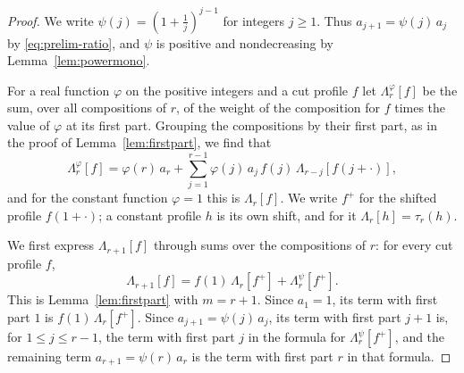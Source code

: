 \documentclass{amsart}
\theoremstyle{definition}
\theoremstyle{remark}
\numberwithin{equation}{section}
\begin{document}
\begin{proof}
We write $\psi(j)=(1+\frac1j)^{j-1}$ for integers $j\ge 1$. Thus $a_{j+1}=\psi(j)\,a_j$ by \eqref{eq:prelim-ratio}, and $\psi$ is positive and nondecreasing by Lemma~\ref{lem:powermono}.

For a real function $\varphi$ on the positive integers and a cut profile $f$ let $\Lambda^{\varphi}_r[f]$ be the sum, over all compositions of $r$, of the weight of the composition for $f$ times the value of $\varphi$ at its first part. Grouping the compositions by their first part, as in the proof of Lemma~\ref{lem:firstpart}, we find that
\[
\Lambda^{\varphi}_r[f]=\varphi(r)\,a_r+\sum_{j=1}^{r-1}\varphi(j)\,a_j\,f(j)\,\Lambda_{r-j}[f(j+\cdot)],
\]
and for the constant function $\varphi=1$ this is $\Lambda_r[f]$. We write $f^{+}$ for the shifted profile $f(1+\cdot)$; a constant profile $h$ is its own shift, and for it $\Lambda_r[h]=\tau_r(h)$.

We first express $\Lambda_{r+1}[f]$ through sums over the compositions of $r$: for every cut profile $f$,
\begin{equation}\label{eq:chains-firstunit}
\Lambda_{r+1}[f]=f(1)\,\Lambda_r[f^{+}]+\Lambda^{\psi}_r[f^{+}].
\end{equation}
This is Lemma~\ref{lem:firstpart} with $m=r+1$. Since $a_1=1$, its term with first part $1$ is $f(1)\,\Lambda_r[f^{+}]$. Since $a_{j+1}=\psi(j)\,a_j$, its term with first part $j+1$ is, for $1\le j\le r-1$, the term with first part $j$ in the formula for $\Lambda^{\psi}_r[f^{+}]$, and the remaining term $a_{r+1}=\psi(r)\,a_r$ is the term with first part $r$ in that formula.


\end{proof}
\end{document}
